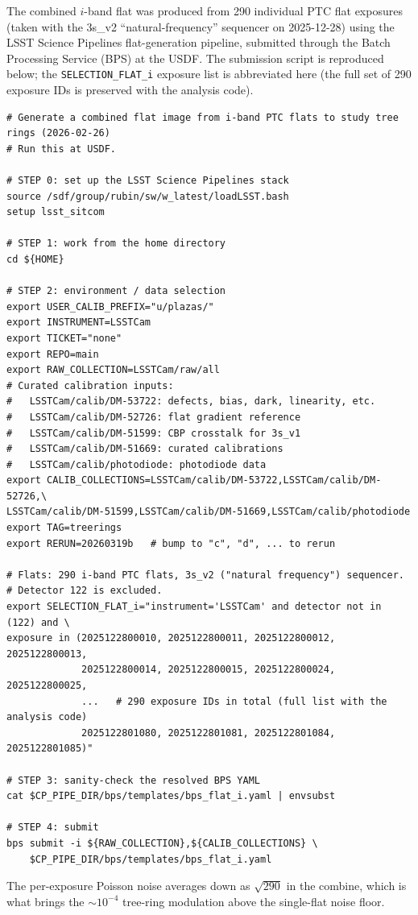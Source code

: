 The combined $i$-band flat was produced from 290 individual PTC flat exposures (taken with the
3s\_v2 ``natural-frequency'' sequencer on 2025-12-28) using the LSST Science Pipelines
flat-generation pipeline, submitted through the Batch Processing Service (BPS) at the USDF.
The submission script is reproduced below; the \texttt{SELECTION\_FLAT\_i} exposure list is
abbreviated here (the full set of 290 exposure IDs is preserved with the analysis code).
%
{\footnotesize
\begin{verbatim}
# Generate a combined flat image from i-band PTC flats to study tree rings (2026-02-26)
# Run this at USDF.

# STEP 0: set up the LSST Science Pipelines stack
source /sdf/group/rubin/sw/w_latest/loadLSST.bash
setup lsst_sitcom

# STEP 1: work from the home directory
cd ${HOME}

# STEP 2: environment / data selection
export USER_CALIB_PREFIX="u/plazas/"
export INSTRUMENT=LSSTCam
export TICKET="none"
export REPO=main
export RAW_COLLECTION=LSSTCam/raw/all
# Curated calibration inputs:
#   LSSTCam/calib/DM-53722: defects, bias, dark, linearity, etc.
#   LSSTCam/calib/DM-52726: flat gradient reference
#   LSSTCam/calib/DM-51599: CBP crosstalk for 3s_v1
#   LSSTCam/calib/DM-51669: curated calibrations
#   LSSTCam/calib/photodiode: photodiode data
export CALIB_COLLECTIONS=LSSTCam/calib/DM-53722,LSSTCam/calib/DM-52726,\
LSSTCam/calib/DM-51599,LSSTCam/calib/DM-51669,LSSTCam/calib/photodiode
export TAG=treerings
export RERUN=20260319b   # bump to "c", "d", ... to rerun

# Flats: 290 i-band PTC flats, 3s_v2 ("natural frequency") sequencer.
# Detector 122 is excluded.
export SELECTION_FLAT_i="instrument='LSSTCam' and detector not in (122) and \
exposure in (2025122800010, 2025122800011, 2025122800012, 2025122800013,
             2025122800014, 2025122800015, 2025122800024, 2025122800025,
             ...   # 290 exposure IDs in total (full list with the analysis code)
             2025122801080, 2025122801081, 2025122801084, 2025122801085)"

# STEP 3: sanity-check the resolved BPS YAML
cat $CP_PIPE_DIR/bps/templates/bps_flat_i.yaml | envsubst

# STEP 4: submit
bps submit -i ${RAW_COLLECTION},${CALIB_COLLECTIONS} \
    $CP_PIPE_DIR/bps/templates/bps_flat_i.yaml
\end{verbatim}
}
%
The per-exposure Poisson noise averages down as $\sqrt{290}$ in the combine, which is what
brings the $\sim10^{-4}$ tree-ring modulation above the single-flat noise floor.

